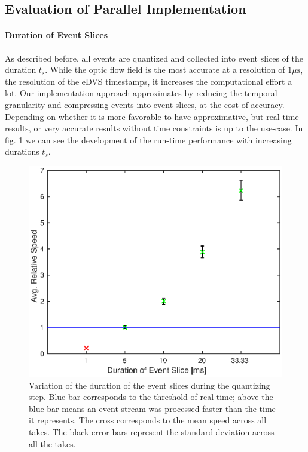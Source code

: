 \subsection{Evaluation of Parallel Implementation}
\paragraph{Duration of Event Slices}
As described before, all events are quantized and collected into event slices of the duration $t_s$.
While the optic flow field is the most accurate at a resolution of $1\mu\mathrm{s}$, the resolution of the eDVS timestamps, it increases the computational effort a lot.
Our implementation approach approximates by reducing the temporal granularity and compressing events into event slices, at the cost of accuracy.
Depending on whether it is more favorable to have approximative, but real-time results, or very accurate results without time constraints is up to the use-case.
In fig. \ref{fig:gpu_tsd} we can see the development of the run-time performance with increasing durations $t_s$.
\begin{figure}[!htb]
	\centering
	\includegraphics[scale=.9]{gpu_tsd.eps}
	\caption[Variation of the duration of the event slices during the quantizing step]{Variation of the duration of the event slices during the quantizing step. Blue bar corresponds to the threshold of real-time; above the blue bar means an event stream was processed faster than the time it represents. The cross corresponds to the mean speed across all takes. The black error bars represent the standard deviation across all the takes.}
	\label{fig:gpu_tsd}
\end{figure}
